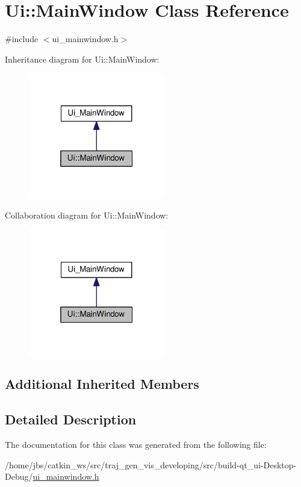 \hypertarget{class_ui_1_1_main_window}{}\section{Ui\+:\+:Main\+Window Class Reference}
\label{class_ui_1_1_main_window}


{\ttfamily \#include $<$ui\+\_\+mainwindow.\+h$>$}



Inheritance diagram for Ui\+:\+:Main\+Window\+:\nopagebreak
\begin{figure}[H]
\begin{center}
\leavevmode
\includegraphics[width=169pt]{class_ui_1_1_main_window__inherit__graph}
\end{center}
\end{figure}


Collaboration diagram for Ui\+:\+:Main\+Window\+:\nopagebreak
\begin{figure}[H]
\begin{center}
\leavevmode
\includegraphics[width=169pt]{class_ui_1_1_main_window__coll__graph}
\end{center}
\end{figure}
\subsection*{Additional Inherited Members}


\subsection{Detailed Description}


The documentation for this class was generated from the following file\+:\begin{DoxyCompactItemize}
\item 
/home/jbs/catkin\+\_\+ws/src/traj\+\_\+gen\+\_\+vis\+\_\+developing/src/build-\/qt\+\_\+ui-\/\+Desktop-\/\+Debug/\hyperlink{ui__mainwindow_8h}{ui\+\_\+mainwindow.\+h}\end{DoxyCompactItemize}
